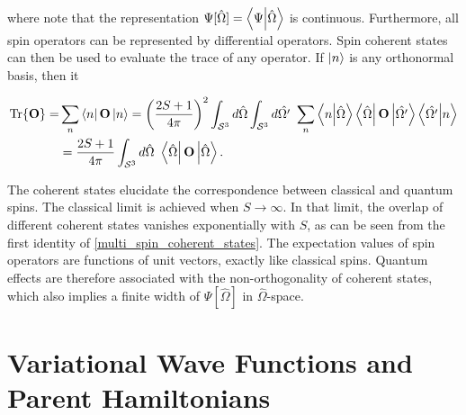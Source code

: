\documentclass{homework}
\begin{document}
where note that the representation $\Psi[\hat{\Omega}] = \bra{\Psi}\ket{\hat{\Omega}}$ is continuous. Furthermore, all spin operators can be represented by differential operators. Spin coherent states can then be used to evaluate the trace of any operator. If $\ket{n}$ is any orthonormal basis, then it

\begin{equation} \begin{split}
    \Tr {{\bf O}} =& \sum_{n} \bra{n}{{\bf O}}\ket{n} = \bigg(\frac{2S+1}{4\pi}\bigg)^2 \int_{\mathcal{S}^3} d\hat{\Omega}  \int_{\mathcal{S}^3} d\hat{\Omega'} \textnormal{ } \sum_{n} \bra{n}\ket{\hat{\Omega}} \bra{\hat{\Omega}}{{\bf O}}\ket{\hat{\Omega'}} \bra{\hat{\Omega'}} \ket{n} \\
    &= \frac{2S+1}{4\pi }\int_{\mathcal{S}^3} d\hat{\Omega} \textnormal{ } \bra{\hat{\Omega}}{{\bf O}}\ket{\hat{\Omega}}.
\end{split}
\label{multi_spin_coherent_states}
\end{equation}

The coherent states elucidate the correspondence between classical and quantum spins. The classical limit is achieved when $S\rightarrow\infty$. In that limit, the overlap of different coherent states vanishes exponentially with $S$, as can be seen from the first identity of \cref{multi_spin_coherent_states}. The expectation values of spin operators are functions of unit vectors, exactly like classical spins. Quantum effects are therefore associated with the non-orthogonality of coherent states, which also implies a finite width of $\Psi[\hat{\Omega}]$ in $\hat{\Omega}$-space. \\

\clearpage

\section{Variational Wave Functions and Parent Hamiltonians}

\blanky \\
\end{document}
